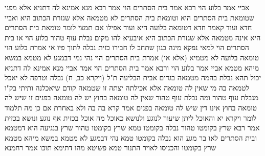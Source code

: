 \documentclass[12pt, openany]{book}
\begin{document}
{אביי אמר  בלוע הוי  רבא אמר  בית הסתרים הוי  אמר רבא  מנא אמינא לה דתניא אלא מפני שטומאת בית הסתרים היא
וטומאת בית הסתרים לא מטמאה אלא שגזרת הכתוב היא 
ואביי חדא ועוד קאמר חדא דטומאה בלועה היא ועוד אפילו אם תמצי לומר טומאת בית הסתרים היא אינה מטמאה אלא שגזרת הכתוב היא 
איבעיא להו  מקום נבלת עוף טהור בלוע הוי או בית הסתרים הוי 
למאי נפקא מינה כגון שתחב לו חבירו כזית נבלה לתוך פיו  אי אמרת בלוע הוי טומאה בלועה לא מטמיא  (אלא אי) אמרת בית הסתרים הוי נהי נמי דבמגע לא מטמא במשא מיהא מטמא
אביי אמר  בלוע הוי ורבא אמר  בית הסתרים הוי  אמר אביי  מנא אמינא לה דתניא יכול תהא נבלת בהמה מטמאה בגדים אבית הבליעה ת"ל (ויקרא כב, ח) נבלה וטרפה לא יאכל לטמאה בה
מי שאין לה טומאה אלא אכילתה יצתה זו שטמאה קודם שיאכלנה 
ותיתי בק"ו מנבלת עוף טהור  ומה נבלת עוף טהור שאין לה טומאה בחוץ יש לה טומאה בפנים זו שיש לה טומאה בחוץ אינו דין שיש לה טומאה בפנים 
אמר קרא בה בה ולא באחרת 
אם כן מה תלמוד לומר {ויקרא יא } והאוכל 
ליתן שיעור לנוגע ולנושא כאוכל מה אוכל בכזית אף נוגע ונושא בכזית 
אמר רבא  שרץ בקומטו טהור נבלה בקומטו טמא 
שרץ בקומטו טהור שרץ בנגיעה הוא דמטמא ובית הסתרים לאו בר מגע הוא  נבלה בקומטו טמא נהי דבמגע לא מטמא במשא מיהא מטמא 
שרץ בקומטו והכניסו לאויר התנור טמא  פשיטא  מהו דתימא  תוכו אמר רחמנא}
\end{document}
